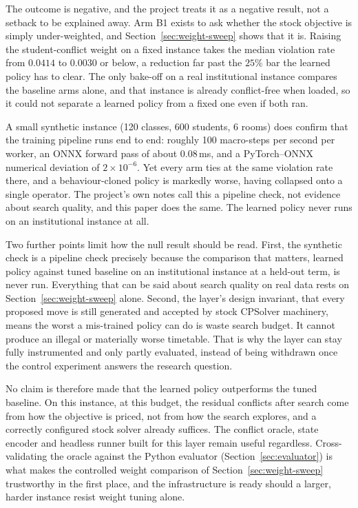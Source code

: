 \documentclass[journal]{IEEEtran}
\begin{document}
The outcome is negative, and the project treats it as a negative result, not a setback to be explained away. Arm B1 exists to ask whether the stock objective is simply under-weighted, and Section~\ref{sec:weight-sweep} shows that it is. Raising the student-conflict weight on a fixed instance takes the median violation rate from $0.0414$ to $0.0030$ or below, a reduction far past the $25\%$ bar the learned policy has to clear. The only bake-off on a real institutional instance compares the baseline arms alone, and that instance is already conflict-free when loaded, so it could not separate a learned policy from a fixed one even if both ran.

A small synthetic instance (120 classes, 600 students, 6 rooms) does confirm that the training pipeline runs end to end: roughly 100 macro-steps per second per worker, an ONNX forward pass of about 0.08\,ms, and a PyTorch--ONNX numerical deviation of $2\times10^{-6}$. Yet every arm ties at the same violation rate there, and a behaviour-cloned policy is markedly worse, having collapsed onto a single operator. The project's own notes call this a pipeline check, not evidence about search quality, and this paper does the same. The learned policy never runs on an institutional instance at all.

Two further points limit how the null result should be read. First, the synthetic check is a pipeline check precisely because the comparison that matters, learned policy against tuned baseline on an institutional instance at a held-out term, is never run. Everything that can be said about search quality on real data rests on Section~\ref{sec:weight-sweep} alone. Second, the layer's design invariant, that every proposed move is still generated and accepted by stock CPSolver machinery, means the worst a mis-trained policy can do is waste search budget. It cannot produce an illegal or materially worse timetable. That is why the layer can stay fully instrumented and only partly evaluated, instead of being withdrawn once the control experiment answers the research question.

No claim is therefore made that the learned policy outperforms the tuned baseline. On this instance, at this budget, the residual conflicts after search come from how the objective is priced, not from how the search explores, and a correctly configured stock solver already suffices. The conflict oracle, state encoder and headless runner built for this layer remain useful regardless. Cross-validating the oracle against the Python evaluator (Section~\ref{sec:evaluator}) is what makes the controlled weight comparison of Section~\ref{sec:weight-sweep} trustworthy in the first place, and the infrastructure is ready should a larger, harder instance resist weight tuning alone.
\end{document}
